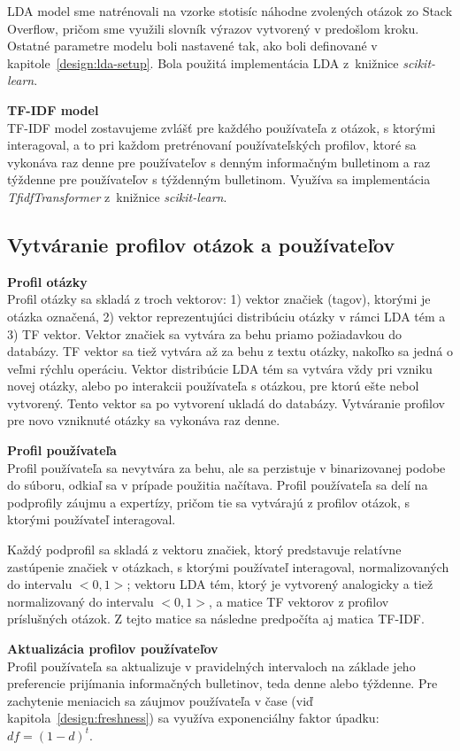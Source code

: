 LDA model sme natrénovali na vzorke stotisíc náhodne zvolených otázok zo Stack Overflow, pričom sme využili slovník výrazov
vytvorený v predošlom kroku. Ostatné parametre modelu boli nastavené tak, ako boli definované v kapitole~\ref{design:lda-setup}.
Bola použitá implementácia LDA z~knižnice \textit{scikit-learn}.

\textbf{TF-IDF model}\\
TF-IDF model zostavujeme zvlášť pre každého používateľa z otázok, s ktorými interagoval, a to pri každom pretrénovaní používateľských
profilov, ktoré sa vykonáva raz denne pre používateľov s denným informačným bulletinom a raz týždenne pre používateľov s týždenným
bulletinom. Využíva sa implementácia \textit{TfidfTransformer} z~knižnice \textit{scikit-learn}.


\subsection{Vytváranie profilov otázok a používateľov}

\textbf{Profil otázky}\\
Profil otázky sa skladá z troch vektorov: 1) vektor značiek (tagov), ktorými je otázka označená, 2) vektor reprezentujúci
distribúciu otázky v rámci LDA tém a 3) TF vektor. Vektor značiek sa vytvára za behu priamo požiadavkou do databázy. TF vektor
sa tiež vytvára až za behu z textu otázky, nakoľko sa jedná o veľmi rýchlu operáciu. Vektor distribúcie LDA tém sa vytvára
vždy pri vzniku novej otázky, alebo po interakcii používateľa s otázkou, pre ktorú ešte nebol vytvorený. Tento vektor
sa po vytvorení ukladá do databázy. Vytváranie profilov pre novo vzniknuté otázky sa vykonáva raz denne.

\textbf{Profil používateľa}\\
Profil používateľa sa nevytvára za behu, ale sa perzistuje v binarizovanej podobe do súboru, odkiaľ sa v prípade použitia
načítava. Profil používateľa sa delí na podprofily záujmu a expertízy, pričom tie sa vytvárajú z profilov otázok, s ktorými
používateľ interagoval.

Každý podprofil sa skladá z vektoru značiek, ktorý predstavuje relatívne zastúpenie značiek v otázkach, s ktorými používateľ interagoval,
normalizovaných do intervalu $<0,1>$; vektoru LDA tém, ktorý je vytvorený analogicky a tiež normalizovaný do intervalu $<0,1>$,
a matice TF vektorov z profilov príslušných otázok. Z tejto matice sa následne predpočíta aj matica TF-IDF.

\textbf{Aktualizácia profilov používateľov}\\
Profil používateľa sa aktualizuje v pravidelných intervaloch na základe jeho preferencie prijímania informačných bulletinov, teda
denne alebo týždenne. Pre zachytenie meniacich sa záujmov používateľa v čase (viď kapitola~\ref{design:freshness}) sa využíva
exponenciálny faktor úpadku: $df = (1-d)^t$.

